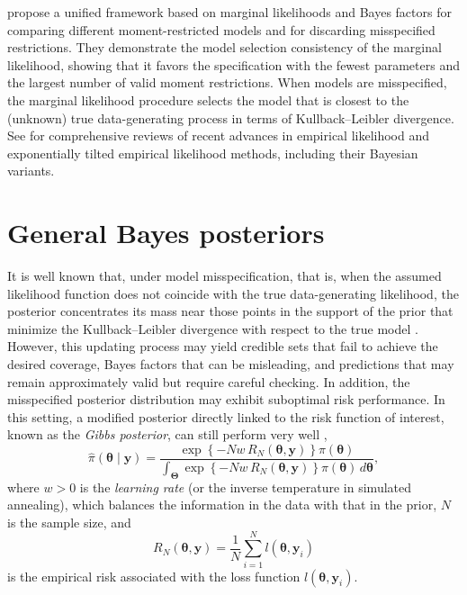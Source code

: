 \cite{chib2018moment} propose a unified framework based on marginal likelihoods and Bayes factors for comparing different moment-restricted models and for discarding misspecified restrictions. They demonstrate the model selection consistency of the marginal likelihood, showing that it favors the specification with the fewest parameters and the largest number of valid moment restrictions. When models are misspecified, the marginal likelihood procedure selects the model that is closest to the (unknown) true data-generating process in terms of Kullback–Leibler divergence. See \cite{lazar2021review, liu2023review} for comprehensive reviews of recent advances in empirical likelihood and exponentially tilted empirical likelihood methods, including their Bayesian variants.

\section{General Bayes posteriors}\label{sec12_10}

It is well known that, under model misspecification, that is, when the assumed likelihood function does not coincide with the true data-generating likelihood, the posterior concentrates its mass near those points in the support of the prior that minimize the Kullback--Leibler divergence with respect to the true model \cite{Kleijn2006}. However, this updating process may yield credible sets that fail to achieve the desired coverage, Bayes factors that can be misleading, and predictions that may remain approximately valid but require careful checking. In addition, the misspecified posterior distribution may exhibit suboptimal risk performance. In this setting, a modified posterior directly linked to the risk function of interest, known as the \textit{Gibbs posterior}, can still perform very well \cite{Jiang2008},
\begin{equation}\label{eq:GibbsPost}
	\hat{\pi}(\boldsymbol{\theta}\mid\mathbf{y})
	=\frac{\exp\left\{-Nw\,R_N(\boldsymbol{\theta},\mathbf{y})\right\}\pi(\boldsymbol{\theta})}
	{\int_{\boldsymbol{\Theta}}\exp\left\{-Nw\,R_N(\boldsymbol{\theta},\mathbf{y})\right\}\pi(\boldsymbol{\theta})\,d\boldsymbol{\theta}},
\end{equation}
where $w>0$ is the \textit{learning rate} (or the inverse temperature in simulated annealing), which balances the information in the data with that in the prior, $N$ is the sample size, and
\[
R_N(\boldsymbol{\theta},\mathbf{y})=\frac{1}{N}\sum_{i=1}^N l(\boldsymbol{\theta},\mathbf{y}_i)
\]
is the empirical risk associated with the loss function $l(\boldsymbol{\theta},\mathbf{y}_i)$.

